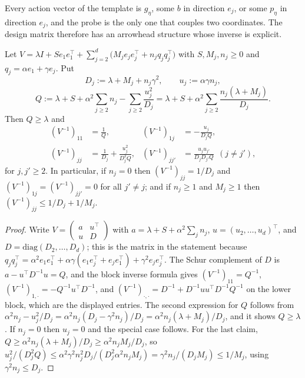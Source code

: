 \documentclass[anon]{alt2027} %
\begin{document}
Every action vector of the template is $g_\eta$, some $b$ in direction $e_j$,
or some $p_\eta$ in direction $e_j$, and the probe is the only one that couples
two coordinates. The design matrix therefore has an arrowhead structure whose
inverse is explicit.

\begin{lemma}
\label{lem:arrowhead}
Let $V=\lambda I+Se_1e_1^\top+\sum_{j=2}^{d}\bigl(M_je_je_j^\top+n_jq_jq_j^\top\bigr)$
with $S,M_j,n_j\ge0$ and $q_j=\alpha e_1+\gamma e_j$. Put
\[
D_j:=\lambda+M_j+n_j\gamma^2,\qquad u_j:=\alpha \gamma n_j,
\]
\[
Q:=\lambda+S+\alpha^2\sum_{j\ge2}n_j-\sum_{j\ge2}\frac{u_j^2}{D_j}
=\lambda+S+\alpha^2\sum_{j\ge2}\frac{n_j(\lambda+M_j)}{D_j}.
\]
Then $Q\ge\lambda$ and
\begin{align*}
(V^{-1})_{11}&=\frac1Q,&
(V^{-1})_{1j}&=-\frac{u_j}{D_jQ},\\
(V^{-1})_{jj}&=\frac1{D_j}+\frac{u_j^2}{D_j^2Q},&
(V^{-1})_{jj'}&=\frac{u_ju_{j'}}{D_jD_{j'}Q}\ \ (j\ne j'),
\end{align*}
for $j,j'\ge2$. In particular, if $n_j=0$ then
$(V^{-1})_{jj}=1/D_j$ and $(V^{-1})_{1j}=(V^{-1})_{jj'}=0$ for all $j'\ne j$; and
if $n_j\ge1$ and $M_j\ge1$ then $(V^{-1})_{jj}\le 1/D_j+1/M_j$.
\end{lemma}

\begin{proof}
Write $V=\begin{pmatrix}a&u^\top\\ u&D\end{pmatrix}$ with
$a=\lambda+S+\alpha^2\sum_jn_j$, $u=(u_2,\dots,u_d)^\top$, and
$D=\mathrm{diag}(D_2,\dots,D_d)$; this is the matrix in the statement because
$q_jq_j^\top=\alpha^2e_1e_1^\top+\alpha \gamma(e_1e_j^\top+e_je_1^\top)+\gamma^2e_je_j^\top$.
The Schur complement of $D$ is $a-u^\top D^{-1}u=Q$, and the block inverse
formula gives
$(V^{-1})_{11}=Q^{-1}$, $(V^{-1})_{1,\cdot}=-Q^{-1}u^\top D^{-1}$, and
$(V^{-1})_{\cdot,\cdot}=D^{-1}+D^{-1}uu^\top D^{-1}Q^{-1}$ on the lower block,
which are the displayed entries. The second expression for $Q$ follows from
$\alpha^2n_j-u_j^2/D_j=\alpha^2n_j(D_j-\gamma^2n_j)/D_j=\alpha^2n_j(\lambda+M_j)/D_j$,
and it shows $Q\ge\lambda$. If $n_j=0$ then $u_j=0$ and the special case
follows. For the last claim, $Q\ge\alpha^2n_j(\lambda+M_j)/D_j\ge\alpha^2n_jM_j/D_j$,
so $u_j^2/(D_j^2Q)\le\alpha^2\gamma^2n_j^2D_j/(D_j^2\alpha^2n_jM_j)=\gamma^2n_j/(D_jM_j)\le1/M_j$,
using $\gamma^2n_j\le D_j$.
\end{proof}
\end{document}
